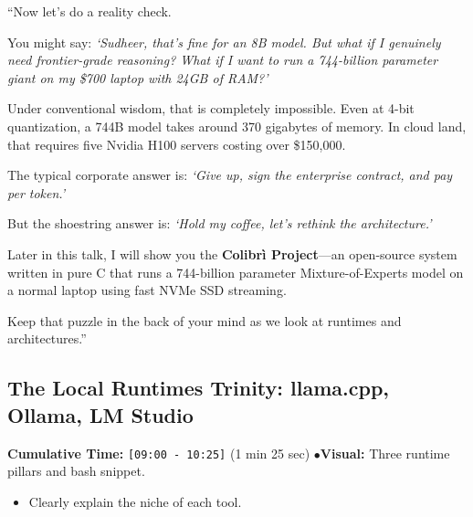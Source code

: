 \documentclass[11pt,a4paper]{article}
\begin{document}
\begin{speechbox}
``Now let's do a reality check.

You might say: \textit{`Sudheer, that's fine for an 8B model. But what if I genuinely need frontier-grade reasoning? What if I want to run a 744-billion parameter giant on my \$700 laptop with 24GB of RAM?'}

Under conventional wisdom, that is completely impossible. Even at 4-bit quantization, a 744B model takes around 370 gigabytes of memory. In cloud land, that requires five Nvidia H100 servers costing over \$150,000.

The typical corporate answer is: \textit{`Give up, sign the enterprise contract, and pay per token.'}

But the shoestring answer is: \textit{`Hold my coffee, let's rethink the architecture.'}

Later in this talk, I will show you the \textbf{Colibr\`i Project}---an open-source system written in pure C that runs a 744-billion parameter Mixture-of-Experts model on a normal laptop using fast NVMe SSD streaming.

Keep that puzzle in the back of your mind as we look at runtimes and architectures.''
\end{speechbox}

\subsection{The Local Runtimes Trinity: llama.cpp, Ollama, LM Studio}
\begin{directionbox}
    \textbf{Cumulative Time:} \texttt{[09:00 - 10:25]} (1 min 25 sec) \quad$\bullet$\quad \textbf{Visual:} Three runtime pillars and bash snippet.
    \begin{itemize}
        \item Clearly explain the niche of each tool.
    \end{itemize}
\end{directionbox}
\end{document}
